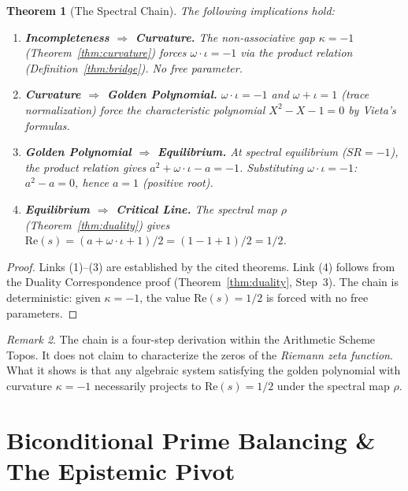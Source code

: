 \documentclass[12pt,oneside]{article}
\theoremstyle{principia}
\newtheorem{theorem}{Theorem}[section]
\theoremstyle{definition}
\theoremstyle{remark}
\newtheorem{remark}[theorem]{Remark}
\providecommand{\kap}{\kappa}
\begin{document}
\begin{theorem}[The Spectral Chain]\label{thm:spectral-chain}
The following implications hold:
\begin{enumerate}
\item \textbf{Incompleteness $\Rightarrow$ Curvature.} The non-associative gap $\kap = -1$ (Theorem~\ref{thm:curvature}) forces $\omega \cdot \iota = -1$ via the product relation (Definition~\ref{thm:bridge}). No free parameter.
\item \textbf{Curvature $\Rightarrow$ Golden Polynomial.} $\omega \cdot \iota = -1$ and $\omega + \iota = 1$ (trace normalization) force the characteristic polynomial $X^2 - X - 1 = 0$ by \emph{Vieta's formulas}.
\item \textbf{Golden Polynomial $\Rightarrow$ Equilibrium.} At spectral equilibrium ($SR = -1$), the product relation gives $a^2 + \omega \cdot \iota - a = -1$. Substituting $\omega \cdot \iota = -1$: $a^2 - a = 0$, hence $a = 1$ (positive root).
\item \textbf{Equilibrium $\Rightarrow$ Critical Line.} The spectral map $\rho$ (Theorem~\ref{thm:duality}) gives $\mathrm{Re}(s) = (a + \omega \cdot \iota + 1)/2 = (1 - 1 + 1)/2 = 1/2$.
\end{enumerate}
\end{theorem}

\begin{proof}
Links (1)--(3) are established by the cited theorems. Link (4) follows from the Duality Correspondence proof (Theorem~\ref{thm:duality}, Step~3). The chain is deterministic: given $\kap = -1$, the value $\mathrm{Re}(s) = 1/2$ is forced with no free parameters. \qedhere
\end{proof}

\begin{remark}
The chain is a four-step derivation within the Arithmetic Scheme Topos. It does not claim to characterize the zeros of the \emph{Riemann zeta function}. What it shows is that any algebraic system satisfying the golden polynomial with curvature $\kap = -1$ necessarily projects to $\mathrm{Re}(s) = 1/2$ under the spectral map $\rho$.
\end{remark}




\section{Biconditional Prime Balancing \& The Epistemic Pivot}
\end{document}
